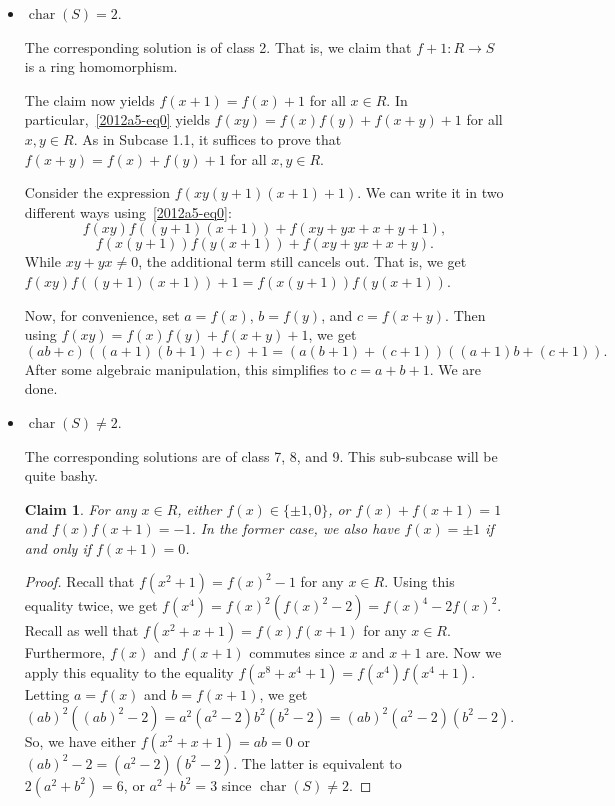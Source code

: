 \documentclass{article}
\DeclareMathOperator{\rchar}{char}
\newtheorem*{claim}{Claim}
\begin{document}
\begin{itemize}

    \item
    $\rchar(S) = 2$.

    The corresponding solution is of class 2.
    That is, we claim that $f + 1 : R \to S$ is a ring homomorphism.
    
    The claim now yields $f(x + 1) = f(x) + 1$ for all $x \in R$.
    In particular,~\eqref{2012a5-eq0} yields $f(xy) = f(x) f(y) + f(x + y) + 1$ for all $x, y \in R$.
    As in Subcase 1.1, it suffices to prove that $f(x + y) = f(x) + f(y) + 1$ for all $x, y \in R$.

    Consider the expression $f(xy (y + 1) (x + 1) + 1)$.
    We can write it in two different ways using~\eqref{2012a5-eq0}:
    \[ f(xy) f((y + 1)(x + 1)) + f(xy + yx + x + y + 1), \]
    \[ f(x(y + 1)) f(y(x + 1)) + f(xy + yx + x + y). \]
    While $xy + yx \neq 0$, the additional term still cancels out.
    That is, we get $f(xy) f((y + 1)(x + 1)) + 1 = f(x(y + 1)) f(y(x + 1))$.

    Now, for convenience, set $a = f(x)$, $b = f(y)$, and $c = f(x + y)$.
    Then using $f(xy) = f(x) f(y) + f(x + y) + 1$, we get
    \[ (ab + c)((a + 1)(b + 1) + c) + 1 = (a(b + 1) + (c + 1))((a + 1)b + (c + 1)). \]
    After some algebraic manipulation, this simplifies to $c = a + b + 1$.
    We are done.

    
    \item
    $\rchar(S) \neq 2$.

    The corresponding solutions are of class 7, 8, and 9.
    This sub-subcase will be quite bashy.

    \begin{claim}
    For any $x \in R$, either $f(x) \in \{\pm 1, 0\}$, or $f(x) + f(x + 1) = 1$ and $f(x) f(x + 1) = -1$.
    In the former case, we also have $f(x) = \pm 1$ if and only if $f(x + 1) = 0$.
    \end{claim}
    \begin{proof}
    Recall that $f(x^2 + 1) = f(x)^2 - 1$ for any $x \in R$.
    Using this equality twice, we get $f(x^4) = f(x)^2 (f(x)^2 - 2) = f(x)^4 - 2 f(x)^2$.
    Recall as well that $f(x^2 + x + 1) = f(x) f(x + 1)$ for any $x \in R$.
    Furthermore, $f(x)$ and $f(x + 1)$ commutes since $x$ and $x + 1$ are.
    Now we apply this equality to the equality $f(x^8 + x^4 + 1) = f(x^4) f(x^4 + 1)$.
    Letting $a = f(x)$ and $b = f(x + 1)$, we get
    \[ (ab)^2 ((ab)^2 - 2) = a^2 (a^2 - 2) b^2 (b^2 - 2) = (ab)^2 (a^2 - 2) (b^2 - 2). \]
    So, we have either $f(x^2 + x + 1) = ab = 0$ or $(ab)^2 - 2 = (a^2 - 2)(b^2 - 2)$.
    The latter is equivalent to $2(a^2 + b^2) = 6$, or $a^2 + b^2 = 3$ since $\rchar(S) \neq 2$.


\end{proof}
\end{itemize}
\end{document}
